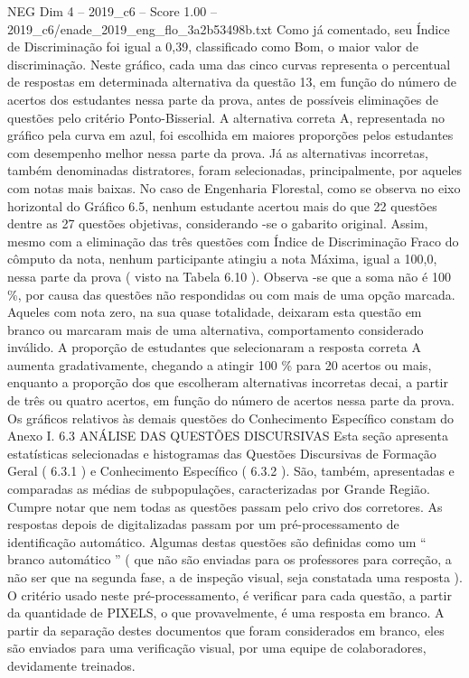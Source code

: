 \begin{textsample}{NEG Dim 4 – 2019\_c6 – Score 1.00 – 2019\_c6/enade\_2019\_eng\_flo\_3a2b53498b.txt}
Como já comentado, seu Índice de Discriminação foi igual a 0,39, classificado como Bom, o maior valor de discriminação.
Neste gráfico, cada uma das cinco curvas representa o percentual de respostas em determinada alternativa da questão 13, em função do número de acertos dos estudantes nessa parte da prova, antes de possíveis eliminações de questões pelo critério Ponto-Bisserial.
A alternativa correta A, representada no gráfico pela curva em azul, foi escolhida em maiores proporções pelos estudantes com desempenho melhor nessa parte da prova.
Já as alternativas incorretas, também denominadas distratores, foram selecionadas, principalmente, por aqueles com notas mais baixas.
No caso de Engenharia Florestal, como se observa no eixo horizontal do Gráfico 6.5, nenhum estudante acertou mais do que 22 questões dentre as 27 questões objetivas, considerando -se o gabarito original.
Assim, mesmo com a eliminação das três questões com Índice de Discriminação Fraco do cômputo da nota, nenhum participante atingiu a nota Máxima, igual a 100,0, nessa parte da prova ( visto na Tabela 6.10 ).
Observa -se que a soma não é 100 \%, por causa das questões não respondidas ou com mais de uma opção marcada.
Aqueles com nota zero, na sua quase totalidade, deixaram esta questão em branco ou marcaram mais de uma alternativa, comportamento considerado inválido.
A proporção de estudantes que selecionaram a resposta correta A aumenta gradativamente, chegando a atingir 100 \% para 20 acertos ou mais, enquanto a proporção dos que escolheram alternativas incorretas decai, a partir de três ou quatro acertos, em função do número de acertos nessa parte da prova.
Os gráficos relativos às demais questões do Conhecimento Específico constam do Anexo I. 6.3 ANÁLISE DAS QUESTÕES DISCURSIVAS Esta seção apresenta estatísticas selecionadas e histogramas das Questões Discursivas de Formação Geral ( 6.3.1 ) e Conhecimento Específico ( 6.3.2 ).
São, também, apresentadas e comparadas as médias de subpopulações, caracterizadas por Grande Região.
Cumpre notar que nem todas as questões passam pelo crivo dos corretores.
As respostas depois de digitalizadas passam por um pré-processamento de identificação automático.
Algumas destas questões são definidas como um “ branco automático ” ( que não são enviadas para os professores para correção, a não ser que na segunda fase, a de inspeção visual, seja constatada uma resposta ).
O critério usado neste pré-processamento, é verificar para cada questão, a partir da quantidade de PIXELS, o que provavelmente, é uma resposta em branco.
A partir da separação destes documentos que foram considerados em branco, eles são enviados para uma verificação visual, por uma equipe de colaboradores, devidamente treinados.

\end{textsample}
